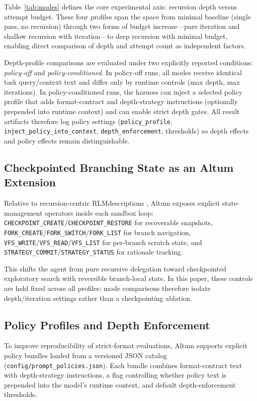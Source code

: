 \documentclass[11pt]{article}
\newcommand{\rlm}{RLM}
\begin{document}
Table~\ref{tab:modes} defines the core experimental axis: recursion depth versus attempt budget. These four profiles span the space from minimal baseline (single pass, no recursion) through two forms of budget increase---pure iteration and shallow recursion with iteration---to deep recursion with minimal budget, enabling direct comparison of depth and attempt count as independent factors.

Depth-profile comparisons are evaluated under two explicitly reported conditions: \emph{policy-off} and \emph{policy-conditioned}. In policy-off runs, all modes receive identical task query/context text and differ only by runtime controls (max depth, max iterations). In policy-conditioned runs, the harness can inject a selected policy profile that adds format-contract and depth-strategy instructions (optionally prepended into runtime context) and can enable strict depth gates. All result artifacts therefore log policy settings (\texttt{policy\_profile}, \texttt{inject\_policy\_into\_context}, \texttt{depth\_enforcement}, thresholds) so depth effects and policy effects remain distinguishable.

\subsection{Checkpointed Branching State as an Altum Extension}
Relative to recursion-centric \rlm descriptions \cite{zhang2025rlm,primeintellect2026rlm}, Altum exposes explicit state-management operators inside each sandbox loop: \texttt{CHECKPOINT\_CREATE}/\texttt{CHECKPOINT\_RESTORE} for recoverable snapshots, \texttt{FORK\_CREATE}/\texttt{FORK\_SWITCH}/\texttt{FORK\_LIST} for branch navigation, \texttt{VFS\_WRITE}/\texttt{VFS\_READ}/\texttt{VFS\_LIST} for per-branch scratch state, and \texttt{STRATEGY\_COMMIT}/\texttt{STRATEGY\_STATUS} for rationale tracking.

This shifts the agent from pure recursive delegation toward checkpointed exploratory search with reversible branch-local state. In this paper, these controls are held fixed across all profiles; mode comparisons therefore isolate depth/iteration settings rather than a checkpointing ablation.

\subsection{Policy Profiles and Depth Enforcement}
To improve reproducibility of strict-format evaluations, Altum supports explicit policy bundles loaded from a versioned JSON catalog (\texttt{config/prompt\_policies.json}). Each bundle combines format-contract text with depth-strategy instructions, a flag controlling whether policy text is prepended into the model's runtime context, and default depth-enforcement thresholds.
\end{document}
